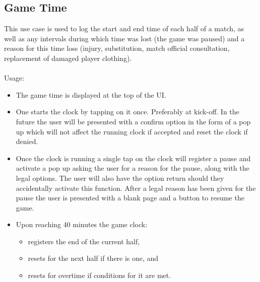 \documentclass[hidelinks,a4paper,12pt]{article}
\begin{document}
	\subsection{Game Time}
	This use case is used to log the start and end time of each half of a match, as well as any intervals during which time was lost (the game was paused) and a reason for this time loss (injury, substitution, match official consultation, replacement of damaged player clothing). 
	\\ \\
	Usage:
	\begin{itemize}
		\item The game time is displayed at the top of the UI.
		\item One starts the clock by tapping on it once. Preferably at kick-off. In the future the user will be presented with a confirm option in the form of a pop up which will not affect the running clock if accepted and reset the clock if denied.
		\item Once the clock is running a single tap on the clock will register a pause and activate a pop up asking the user for a reason for the pause, along with the legal options. The user will also have the option return should they accidentally activate this function. After a legal reason has been given for the pause the user is presented with a blank page and a button to resume the game.
		\item Upon reaching 40 minutes the game clock:
		\begin{itemize}
		\item registers the end of the current half,
		\item resets for the next half if there is one, and
		\item resets for overtime if conditions for it are met.
		\end{itemize}
	\end{itemize}

\newpage
\end{document}
